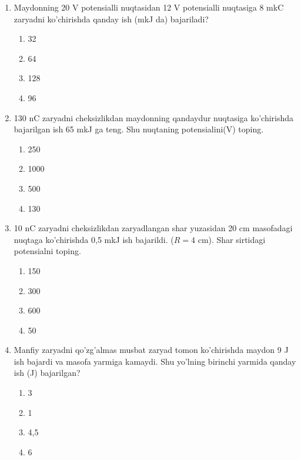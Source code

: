 \begin{enumerate}
    \item Maydonning 20 V potensialli nuqtasidan 12 V potensialli nuqtasiga 8 mkC zaryadni ko’chirishda qanday ish (mkJ da) bajariladi?
    \begin{enumerate}[label=\Alph*)]
        \item 32
        \item 64 %
        \item 128
        \item 96
    \end{enumerate}

    \item 130 nC zaryadni cheksizlikdan maydonning qandaydur nuqtasiga ko’chirishda bajarilgan ish 65 mkJ ga teng. Shu nuqtaning potensialini(V) toping.
    \begin{enumerate}[label=\Alph*)]
        \item 250
        \item 1000
        \item 500 %
        \item 130
    \end{enumerate}

    \item 10 nC zaryadni cheksizlikdan zaryadlangan shar yuzasidan 20 cm masofadagi nuqtaga ko’chirishda 0,5 mkJ ish bajarildi. ($R=4$ cm). Shar sirtidagi potensialni toping.
    \begin{enumerate}[label=\Alph*)]
        \item 150
        \item 300 %
        \item 600
        \item 50
    \end{enumerate}

    \item Manfiy zaryadni qo’zg’almas musbat zaryad tomon ko'chirishda maydon 9 J ish bajardi va masofa yarmiga kamaydi. Shu yo’lning birinchi yarmida qanday ish (J) bajarilgan?
    \begin{enumerate}[label=\Alph*)]
        \item 3 %
        \item 1
        \item 4,5
        \item 6
    \end{enumerate}

\end{enumerate}
